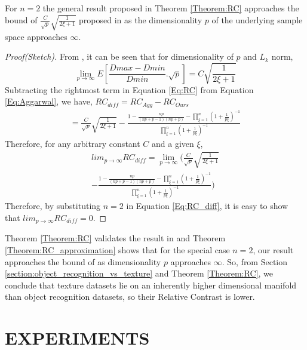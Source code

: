 \documentclass[11pt,a4paper]{article}
\begin{document}
\begin{theorem}\label{Theorem:RC_approximation}
For $n=2$ the general result proposed in Theorem \ref{Theorem:RC} approaches the bound of $\frac{C}{\sqrt{p}}\sqrt{\frac{1}{2\xi+1}}$ proposed in \cite{Aggarwal01} as the dimensionality $p$ of the underlying sample space approaches $\infty$.
\end{theorem}
\begin{proof}[Proof(Sketch)] From \cite{Aggarwal01}, it can be seen that for dimensionality of $p$ and $L_k$ norm, 
\begin{equation}\label{Eq:Aggarwal}
\lim_{p \to \infty} E[\frac{Dmax - Dmin}{Dmin}.\sqrt{p}] = C\sqrt{\frac{1}{2\xi+1}}
\end{equation}
Subtracting the rightmost term in Equation \ref{Eq:RC} from Equation \ref{Eq:Aggarwal}, we have, ${RC}_{diff} = {RC}_{Agg} - {RC}_{Ours}$
\begin{equation}
\begin{split}
= \frac{C}{\sqrt{p}}\sqrt{\frac{1}{2\xi+1}}
- \frac{1-\frac{np}{(np+p-1)(np+p)}-\prod_{\xi=1}^n (1 + \frac{1}{p\xi})^{-1}}{\prod_{\xi=1}^n (1 + \frac{1}{p\xi})^{-1}}
\end{split}
\end{equation}
Therefore, for any arbitrary constant $C$ and a given $\xi$,
\begin{multline}\label{Eq:RC_diff}
lim_{p \to \infty}{RC}_{diff} = \lim_{p \to \infty} \Big(\frac{C}{\sqrt{p}}\sqrt{\frac{1}{2\xi+1}} \\
- \frac{1-\frac{np}{(np+p-1)(np+p)}-\prod_{\xi=1}^n (1 + \frac{1}{p\xi})^{-1}}{\prod_{\xi=1}^n (1 + \frac{1}{p\xi})^{-1}}\Big) 
\end{multline}
Therefore, by substituting $n=2$ in Equation \ref{Eq:RC_diff}, it is easy to show that $
lim_{p \to \infty}{RC}_{diff} = 0$.
\end{proof}
Theorem \ref{Theorem:RC} validates the result in \cite{Beyer1999} and Theorem \ref{Theorem:RC_approximation} shows that for the special case $n=2$, our result approaches the bound of \cite{Aggarwal01} as dimensionality $p$ approaches $\infty$. So, from Section \ref{section:object_recognition_vs_texture} and Theorem \ref{Theorem:RC}, we conclude that texture datasets lie on an inherently higher dimensional manifold than object recognition datasets, so their Relative Contrast is lower.
 
\section{EXPERIMENTS}\label{experiments}
\end{document}
